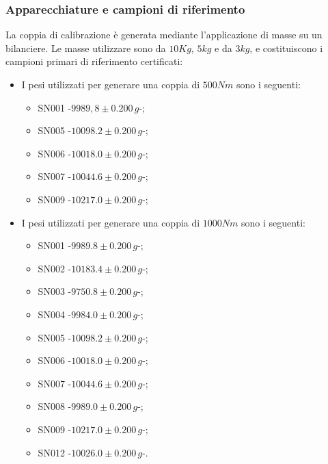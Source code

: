 \documentclass[a4paper, twoside]{article}
\begin{document}
\subsubsection{Apparecchiature e campioni di riferimento}
La coppia di calibrazione è generata mediante l'applicazione di masse su un bilanciere. Le masse utilizzare sono da $10Kg$, $5kg$ e da $3kg$, e costituiscono i campioni primari di riferimento certificati:
\begin{itemize}

    \item I pesi utilizzati per generare una coppia di $500Nm$ sono i seguenti:
        
        \begin{itemize}    
            \item SN001 -$9989,8 \pm 0.200\,g$-;
            \item SN005 -$10098.2 \pm 0.200\,g$-;
            \item SN006 -$10018.0 \pm 0.200\,g$-;
            \item SN007 -$10044.6 \pm 0.200\,g$-;
            \item SN009 -$10217.0 \pm 0.200\,g$-;
        \end{itemize}

    \item I pesi utilizzati per generare una coppia di $1000Nm$ sono i seguenti:
       
        \begin{itemize}
            \item SN001 -$9989.8 \pm 0.200\,g$-;
            \item SN002 -$10183.4 \pm 0.200\,g$-;
            \item SN003 -$9750.8 \pm 0.200\,g$-;
            \item SN004 -$9984.0 \pm 0.200\,g$-;
            \item SN005 -$10098.2 \pm 0.200\,g$-;
            \item SN006 -$10018.0 \pm 0.200\,g$-;
            \item SN007 -$10044.6 \pm 0.200\,g$-;
            \item SN008 -$9989.0 \pm 0.200\,g$-;
            \item SN009 -$10217.0 \pm 0.200\,g$-;
            \item SN012 -$10026.0\pm 0.200\,g$-.
        \end{itemize}

\end{itemize}
\end{document}
